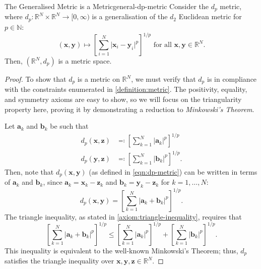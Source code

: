 \documentclass{article}
\renewcommand*\vec{\mathbf}
\numberwithin{equation}{section}
\numberwithin{figure}{section}
\begin{document}
\begin{theorem}{The Generalised Metric is a Metric}{general-dp-metric}
    Consider the $ d_p $ metric, where $ d_p \colon \mathbb{R}^N \times
    \mathbb{R}^N \to [0, \infty) $ is a generalisation of the $ d_2 $ Euclidean
    metric for $ p \in \mathbb{N} $:
    \begin{equation}
        (\vec{x}, \vec{y}) \mapsto \left[\sum_{i=1}^N \vert \vec{x}_i -
        \vec{y}_i \vert^p\right]^{1/p} \label{eqn:dp-metric} \text { for all }
        \vec{x}, \vec{y} \in \mathbb{R}^N.
    \end{equation}
    Then, $ (\mathbb{R}^N, d_p) $ is a metric space.
    \begin{proof}
        To show that $ d_p $ is a metric on $ \mathbb{R}^N $, we must verify
        that $ d_p $ is in compliance with the constraints enumerated in
        \cref{definition:metric}. The positivity, equality, and symmetry axioms
        are easy to show, so we will focus on the triangularity property here,
        proving it by demonstrating a reduction to \emph{Minkowski's Theorem}.

        Let $ \vec{a}_k $ and $ \vec{b}_k $ be such that
        \begin{align}
            d_p(\vec{x}, \vec{z}) &\eqcolon \left[\sum_{k=1}^N \vert \vec{a}_k
                \vert^p\right]^{1/p} \\
            d_p(\vec{y}, \vec{z}) &\eqcolon \left[\sum_{k=1}^N \vert \vec{b}_k
                \vert^p\right]^{1/p}.
        \end{align}
        Then, note that $ d_p(\vec{x}, \vec{y}) $ (as defined in
        \cref{eqn:dp-metric}) can be
        written in terms of $ \vec{a}_k $ and $ \vec{b}_k $, since $ \vec{a}_k =
        \vec{x}_k - \vec{z}_k $ and $ \vec{b}_k = \vec{y}_k - \vec{z}_k $ for
        $ k = 1, \ldots, N $:
        \begin{equation}
            d_p(\vec{x}, \vec{y}) = \left[\sum_{k=1}^N \vert \vec{a}_k +
            \vec{b}_k \vert^p\right]^{1/p}.
        \end{equation}
        The triangle inequality, as stated in \cref{axiom:triangle-inequality},
        requires that
        \begin{equation}
            \left[\sum_{k=1}^N \vert \vec{a}_k + \vec{b}_k \vert^p\right]^{1/p}
            \leq \left[\sum_{k=1}^N \vert \vec{a}_k \vert^p\right]^{1/p} +
            \left[\sum_{k=1}^N \vert \vec{b}_k \vert^p\right]^{1/p}.
        \end{equation}
        This inequality is equivalent to the well-known Minkowski's Theorem;
        thus, $ d_p $ satisfies the triangle inequality over $ \vec{x}, \vec{y},
        \vec{z} \in \mathbb{R}^N $.
    \end{proof}
\end{theorem}
\end{document}
